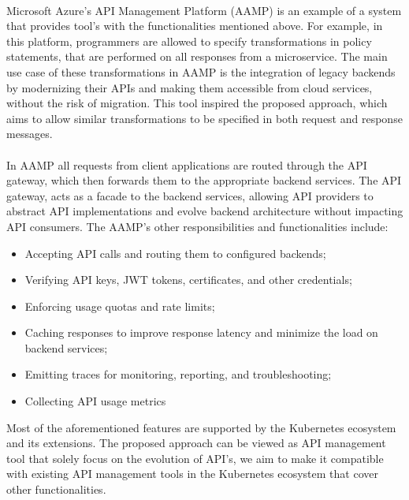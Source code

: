\paragraph{}

Microsoft Azure's API Management Platform (AAMP) is an example of a system that provides tool's with the functionalities mentioned above.
For example, in this platform, programmers are allowed to specify transformations in policy statements, that are performed on all responses from a microservice.
The main use case of these transformations in AAMP is the integration of legacy backends by modernizing their APIs and making them accessible from cloud services, without the risk of migration.
This tool inspired the proposed approach, which aims to allow similar transformations to be specified in both request and response messages.

\paragraph{}

In AAMP all requests from client applications are routed through the API gateway, which then forwards them to the appropriate backend services.
The API gateway, acts as a facade to the backend services,
allowing API providers to abstract API implementations and evolve backend architecture without impacting API consumers.
The AAMP's other responsibilities and functionalities include:

\begin{itemize}
    \item Accepting API calls and routing them to configured backends;
    \item Verifying API keys, JWT tokens, certificates, and other credentials;
    \item Enforcing usage quotas and rate limits;
    \item Caching responses to improve response latency and minimize the load on backend services;
    \item Emitting traces for monitoring, reporting, and troubleshooting;
    \item Collecting API usage metrics
\end{itemize}

Most of the aforementioned features are supported by the Kubernetes ecosystem and its extensions.
The proposed approach can be viewed as API management tool that solely focus on the evolution of API's,
we aim to make it compatible with existing API management tools in the Kubernetes ecosystem that cover other functionalities.
